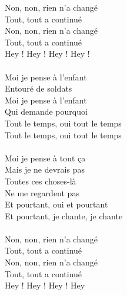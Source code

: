 Non, non, rien n’a changé\\
Tout, tout a continué\\
Non, non, rien n’a changé\\
Tout, tout a continué\\
Hey ! Hey ! Hey ! Hey !\\\\
Moi je pense à l'enfant\\
Entouré de soldats\\
Moi je pense à l'enfant\\
Qui demande pourquoi\\
Tout le temps, oui tout le temps\\
Tout le temps, oui tout le temps\\\\
Moi je pense à tout ça\\
Mais je ne devrais pas\\
Toutes ces choses-là\\
Ne me regardent pas\\
Et pourtant, oui et pourtant\\
Et pourtant, je chante, je chante\\\\
Non, non, rien n’a changé\\
Tout, tout a continué\\
Non, non, rien n’a changé\\
Tout, tout a continué\\
Hey ! Hey ! Hey ! Hey 